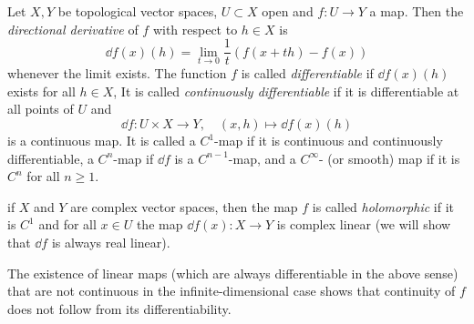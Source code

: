 \begin{defn}
    Let $X,Y$ be topological vector spaces, $U\subset X$ open and $f:U\to Y$ a map. Then the \emph{directional derivative} of $f$ with respect to $h\in X$ is
    \[\dd f(x)(h)=\lim_{t\to 0}\frac{1}{t}\left(f(x+th)-f(x)\right)\]
    whenever the limit exists. The function $f$ is called \emph{differentiable} if $\dd f(x)(h)$ exists for all $h\in X$, It is called \emph{continuously differentiable} if it is differentiable at all points of $U$ and 
    \[\dd f:U\times X\to Y,\quad (x,h)\mapsto \dd f(x)(h)\]
    is a continuous map. It is called a $C^1$-map if it is continuous and continuously differentiable, a $C^n$-map if $\dd f$ is a $C^{n-1}$-map, and a $C^\infty$- (or smooth) map if it is $C^n$ for all $n\geq 1$.

    if $X$ and $Y$ are complex vector spaces, then the map $f$ is called \emph{holomorphic} if it is $C^1$ and for all $x\in U$ the map $\dd f(x):X\to Y$ is complex linear (we will show that $\dd f$ is always real linear).
\end{defn}
\begin{rem}
    The existence of linear maps (which are always differentiable in the above sense) that are not continuous in the infinite-dimensional case shows that continuity of $f$ does not follow from its differentiability.
\end{rem}

